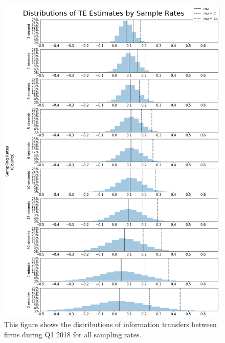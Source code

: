 
\begin{figure}[htb!]
  \centerline{\includegraphics[scale=0.4]{figures/EarnAnnounceTE/TEDist.png}}
  \caption{This figure shows the distributions of information transfers between firms during Q1 2018 for all sampling rates.}
  \label{fig:TEDist}
\end{figure}

